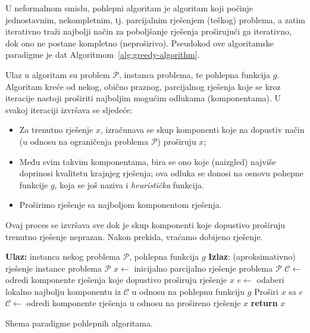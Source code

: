 U neformalnom smislu, pohlepni algoritam je algoritam koji počinje jednostavnim, nekompletnim, tj. parcijalnim rješenjem (teškog) problema, a zatim iterativno traži najbolji način za poboljšanje rješenja proširujući ga iterativno, dok ono ne postane kompletno (neproširivo). Pseudokod ove algoritamske paradigme je dat Algoritmom~\ref{alg:greedy-algorithm}. 

Ulaz u algoritam su problem $\mathcal{P}$, instanca problema, te pohlepna funkcija $g$.  Algoritam kreće od nekog, obično praznog, parcijalnog rješenja koje se kroz iteracije nastoji proširiti najboljim mogućim odlukama (komponentama). U svakoj iteraciji izvršava se sljedeće:
 \begin{itemize}
 	\item Za trenutno rješenje $x$, izračunava se skup komponenti koje na dopustiv način (u odnosu na ograničenja problema $\mathcal{P}$) proširuju $x$;
 	\item Među svim takvim komponentama, bira se ono koje (naizgled) najviše doprinosi kvalitetu krajnjeg rješenja; ova odluka se donosi na osnovu pohepne funkcije $g$, koja se još naziva i \textit{heuristička} funkcija. 
 	\item Proširimo rješenje sa najboljom komponentom rješenja.
 \end{itemize}
Ovaj proces se izvršava sve dok je skup komponenti koje dopustivo proširuju trenutno rješenje neprazan. Nakon prekida, vraćamo dobijeno rješenje.


\begin{algorithm}
	\begin{algorithmic}[1]
		\State \textbf{Ulaz:}   instanca nekog problema $\mathcal{P}$, pohlepna funkcija $g$
		\State \textbf{Izlaz}: (aproksimativno) rješenje instance problema $\mathcal{P}$
		\State $x\gets$ inicijalno parcijalno rješenje problema $\mathcal{P}$
		\State $\mathcal{C}\gets$ odredi komponente rješenja koje dopustivo proširuju rješenje $x$
		    \State $e \gets$ odaberi lokalno najbolju komponentu iz $\mathcal{C}$ u odnosu na pohlepnu funkciju $g$
		    \State Proširi $x$ sa $e$
		     \State $\mathcal{C}\gets$ odredi komponente rješenja u odnosu na prošireno rješenje $x$
		\EndWhile
		   \State \textbf{return} $x$
	\end{algorithmic}

    \caption{Shema paradigme pohlepnih algoritama.}    \label{alg:greedy-algorithm}
\end{algorithm}

